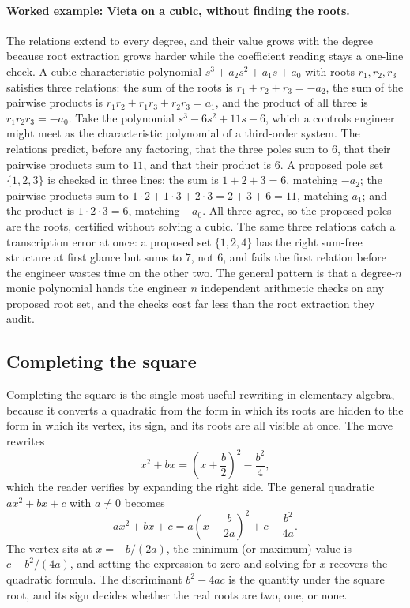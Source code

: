 \paragraph{Worked example: Vieta on a cubic, without finding the roots.}
The relations extend to every degree, and their value grows with the
degree because root extraction grows harder while the coefficient reading
stays a one-line check. A cubic characteristic polynomial $s^{3} + a_{2}
s^{2} + a_{1} s + a_{0}$ with roots $r_{1}, r_{2}, r_{3}$ satisfies three
relations: the sum of the roots is $r_{1} + r_{2} + r_{3} = -a_{2}$, the
sum of the pairwise products is $r_{1}r_{2} + r_{1}r_{3} + r_{2}r_{3} =
a_{1}$, and the product of all three is $r_{1}r_{2}r_{3} = -a_{0}$. Take
the polynomial $s^{3} - 6 s^{2} + 11 s - 6$, which a controls engineer
might meet as the characteristic polynomial of a third-order system. The
relations predict, before any factoring, that the three poles sum to $6$,
that their pairwise products sum to $11$, and that their product is $6$. A
proposed pole set $\{1, 2, 3\}$ is checked in three lines: the sum is $1 +
2 + 3 = 6$, matching $-a_{2}$; the pairwise products sum to $1\cdot 2 +
1\cdot 3 + 2\cdot 3 = 2 + 3 + 6 = 11$, matching $a_{1}$; and the product
is $1\cdot 2\cdot 3 = 6$, matching $-a_{0}$. All three agree, so the
proposed poles are the roots, certified without solving a cubic. The same
three relations catch a transcription error at once: a proposed set
$\{1, 2, 4\}$ has the right sum-free structure at first glance but sums to
$7$, not $6$, and fails the first relation before the engineer wastes time
on the other two. The general pattern is that a degree-$n$ monic
polynomial hands the engineer $n$ independent arithmetic checks on any
proposed root set, and the checks cost far less than the root extraction
they audit.

\subsection{Completing the square}

Completing the square is the single most useful rewriting in
elementary algebra, because it converts a quadratic from the form in
which its roots are hidden to the form in which its vertex, its sign,
and its roots are all visible at once. The move rewrites
\[
x^{2} + bx = \left(x + \frac{b}{2}\right)^{2} - \frac{b^{2}}{4},
\]
which the reader verifies by expanding the right side. The general
quadratic $ax^{2} + bx + c$ with $a \neq 0$ becomes
\[
a x^{2} + b x + c
= a\left(x + \frac{b}{2a}\right)^{2} + c - \frac{b^{2}}{4a}.
\]
The vertex sits at $x = -b/(2a)$, the minimum (or maximum) value is
$c - b^{2}/(4a)$, and setting the expression to zero and solving for
$x$ recovers the quadratic formula. The discriminant $b^{2} - 4ac$ is
the quantity under the square root, and its sign decides whether the
real roots are two, one, or none.

